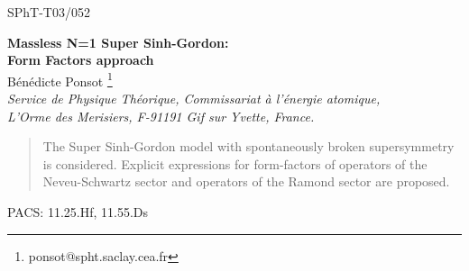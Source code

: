\documentclass[11pt,a4paper]{article}
\begin{document}
\bigskip
\hfill\hbox{SPhT-T03/052} \vspace{2cm}

\begin{center}
{\Large \textbf{Massless N=1 Super Sinh-Gordon:\\ \vspace{0.5cm}  Form Factors approach}} \\
\vspace{1.2cm} {\Large B\'en\'edicte Ponsot \footnote{\textsf
{ponsot@spht.saclay.cea.fr}}} \\
\vspace{0.7cm} {\it  Service de Physique Th\'eorique, Commissariat
\`a l'\'energie
atomique,\\
L'Orme des Merisiers,
 F-91191 Gif sur Yvette, France.}\\
\vspace{1.2cm}
\end{center}


\begin{abstract}
The \coordHE{} Super Sinh-Gordon model with spontaneously broken supersymmetry is considered.
Explicit expressions for form-factors of operators \coordHE{} of the Neveu-Schwartz sector
 and operators \coordHE{} of the Ramond sector are proposed.
\end{abstract}
\begin{center}
 PACS: 11.25.Hf, 11.55.Ds
\end{center}

\vspace{1cm}
\end{document}
